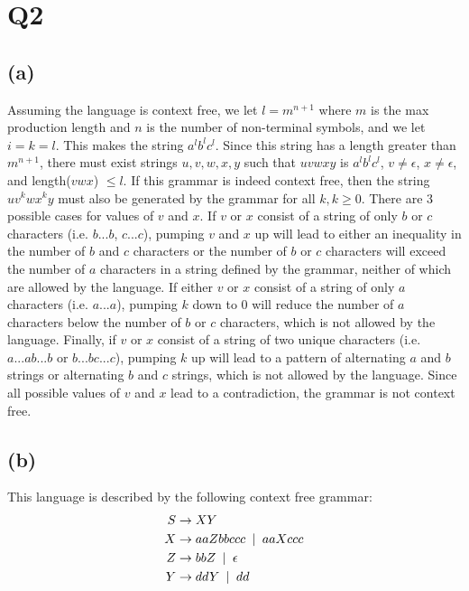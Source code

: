 \documentclass{article}
\begin{document}
	\section*{Q2}
	\subsection*{(a)}
	Assuming the language is context free, we let $l = m^{n+1}$ where $m$ is the max production length and $n$ is the number of non-terminal symbols, and we let $i = k = l$. This makes the string $a^lb^lc^l$. Since this string has a length greater than $m^{n+1}$, there must exist strings $u, v, w, x, y$ such that $uvwxy$ is $a^lb^lc^l$, $v \neq \epsilon$, $x \neq \epsilon$, and length($vwx$) $\leq l$. If this grammar is indeed context free, then the string $uv^kwx^ky$ must also be generated by the grammar for all $k, k \geq 0$. There are 3 possible cases for values of $v$ and $x$. If $v$ or $x$ consist of a string of only $b$ or $c$ characters (i.e. $b...b$, $c...c$), pumping $v$ and $x$ up will lead to either an inequality in the number of $b$ and $c$ characters or the number of $b$ or $c$ characters will exceed the number of $a$ characters in a string defined by the grammar, neither of which are allowed by the language. If either $v$ or $x$ consist of a string of only $a$ characters (i.e. $a...a$), pumping $k$ down to 0 will reduce the number of $a$ characters below the number of $b$ or $c$ characters, which is not allowed by the language. Finally, if $v$ or $x$ consist of a string of two unique characters (i.e. $a...ab...b$ or $b...bc...c$), pumping $k$ up will lead to a pattern of alternating $a$ and $b$ strings or alternating $b$ and $c$ strings, which is not allowed by the language. Since all possible values of $v$ and $x$ lead to a contradiction, the grammar is not context free.
	\subsection*{(b)}
	This language is described by the following context free grammar:
		\begin{align*}
			S &\rightarrow XY\\
			X &\rightarrow aaZbbccc \hphantom{a} | \hphantom{a} aaXccc\\
			Z &\rightarrow bbZ \hphantom{a} | \hphantom{a} \epsilon\\
			Y &\rightarrow ddY \hphantom{a} | \hphantom{a} dd
		\end{align*}
\end{document}
